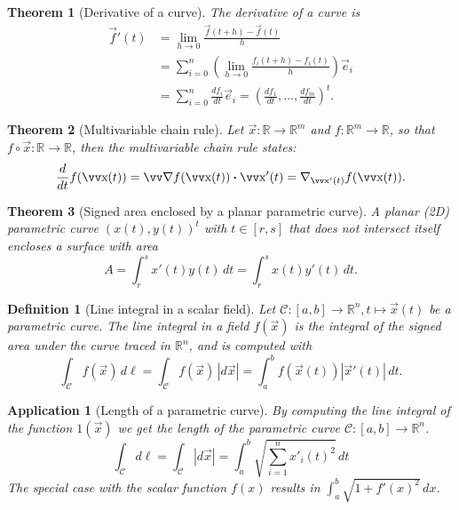 \documentclass[twocolumn, margin=small]{tex/hsrzf}
\theoremstyle{fuvarzf}
\newtheorem{theorem}{Theorem}
\newtheorem{application}{Application}
\newtheorem{definition}{Definition}
\begin{document}
\begin{theorem}[Derivative of a curve]
  The derivative of a curve is
  \begin{align*}
    \vec{f}'(t) &= \lim_{h\to 0} \frac{\vec{f}(t + h) - \vec{f}(t)}{h} \\
    &= \sum_{i=0}^n \left(\lim_{h\to 0} \frac{f_i(t+h) - f_i(t)}{h}\right) \vec{e}_i \\
    &= \sum_{i=0}^n \frac{df_i}{dt}\vec{e}_i
    = \left(\frac{df_1}{dt}, \ldots, \frac{df_m}{dt}\right)^t .
  \end{align*}
\end{theorem}

\begin{theorem}[Multivariable chain rule]
  Let \(\vec{x}: \mathbb{R} \to \mathbb{R}^m\) and \(f: \mathbb{R}^m \to
  \mathbb{R}\), so that \(f\circ\vec{x}: \mathbb{R} \to \mathbb{R}\), then
  the multivariable chain rule states:
  \[
    \frac{d}{dt}f(\vec{x}(t)) = \grad f (\vec{x}(t)) \dotp \vec{x}'(t)
      = \nabla_{\vec{x}'(t)} f(\vec{x}(t)) .
  \]
\end{theorem}

\begin{theorem}[Signed area enclosed by a planar parametric curve]
  A planar (2D) parametric curve \((x(t), y(t))^t\) with \(t\in[r,s]\) that does
  not intersect itself encloses a surface with area
  \[
    A = \int_r^s x'(t)y(t) \,dt
      = \int_r^s x(t)y'(t) \,dt .
  \]
\end{theorem}

\begin{definition}[Line integral in a scalar field]
  Let \(\mathcal{C}:[a,b]\to\mathbb{R}^n, t \mapsto \vec{x}(t)\) be a
  parametric curve. The \emph{line integral} in a field \(f(\vec{x})\) is the
  integral of the signed area under the curve traced in \(\mathbb{R}^n\), and
  is computed with
  \[
    \int_\mathcal{C} f(\vec{x}) \,d\ell 
    = \int_\mathcal{C} f(\vec{x}) \,|d\vec{x}|
    = \int_a^b f(\vec{x}(t)) |\vec{x}'(t)| \, dt .
  \]
\end{definition}

\begin{application}[Length of a parametric curve]
  By computing the line integral of the function \(1(\vec{x})\) we get the
  length of the parametric curve \(\mathcal{C}:[a,b]\to\mathbb{R}^n\).
  \[
    \int_\mathcal{C}d\ell 
    = \int_\mathcal{C} |d\vec{x}|
    = \int_a^b \sqrt{\sum_{i=1}^n x'_i(t)^2} \,dt
  \]
  The special case with the scalar function \(f(x)\) results in
  \(\int_a^b\sqrt{1+f'(x)^2}\,dx\).
\end{application}
\end{document}
